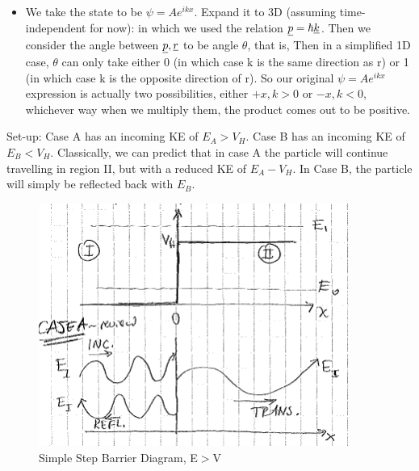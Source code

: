 \documentclass{school-22.101-notes}
\begin{document}
\begin{itemize}
\item We take the state to be $\psi = A e^{ikx}$. Expand it to 3D (assuming time-independent for now):
in which we used the relation $\underline{p} = \hbar \underline{k}$. Then we consider the angle between $\underline{p}, \underline{r}$ to be angle $\theta$, that is, 
Then in a simplified 1D case, $\theta$ can only take either 0 (in which case k is the same direction as r) or 1 (in which case k is the opposite direction of r). So our original $\psi = A e^{ikx}$ expression is actually two possibilities, either $+x, k>0$ or $-x, k<0$, whichever way when we multiply them, the product comes out to be positive. 
\end{itemize}




\clearpage
{} \label{simple-step-barrier}
Set-up: Case A has an incoming KE of $E_A > V_H$. Case B has an incoming KE of $E_B < V_H$. Classically, we can predict that in case A the particle will continue travelling in region II, but with a reduced KE of $E_A - V_H$. In Case B, the particle will simply be reflected back with $E_B$. 

\begin{figure}[h!]
    \centering
    \includegraphics[width=4in]{images/qm/step-barrier-caseA.png}
    \caption{Simple Step Barrier Diagram, E$>$V}
\end{figure}
\end{document}
